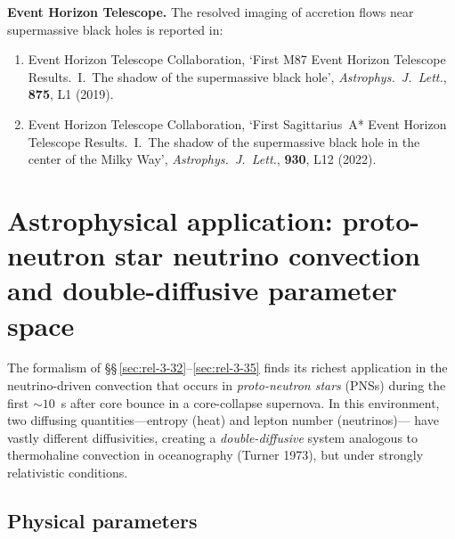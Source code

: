 \noindent \textbf{Event Horizon Telescope.}  The resolved imaging of
accretion flows near supermassive black holes is reported in:

\begin{enumerate}
\item[R15.] Event Horizon Telescope Collaboration, `First M87 Event
  Horizon Telescope Results.\ I.\ The shadow of the supermassive black
  hole', \emph{Astrophys.\ J.\ Lett.}, \textbf{875}, L1 (2019).

\item[R16.] Event Horizon Telescope Collaboration, `First Sagittarius~A*
  Event Horizon Telescope Results.\ I.\ The shadow of the supermassive
  black hole in the center of the Milky Way', \emph{Astrophys.\ J.\ Lett.},
  \textbf{930}, L12 (2022).
\end{enumerate}


\section{Astrophysical application: proto-neutron star neutrino
convection and double-diffusive parameter space}
\label{sec:rel-3-app-32-35}

The formalism of \S\S\,\ref{sec:rel-3-32}--\ref{sec:rel-3-35} finds its
richest application in the neutrino-driven convection that occurs in
\emph{proto-neutron stars} (PNSs) during the first $\sim 10$~s after
core bounce in a core-collapse supernova.  In this environment, two
diffusing quantities---entropy (heat) and lepton number (neutrinos)---
have vastly different diffusivities, creating a \emph{double-diffusive}
system analogous to thermohaline convection in oceanography
(Turner 1973), but under strongly relativistic conditions.

\subsection{Physical parameters}

